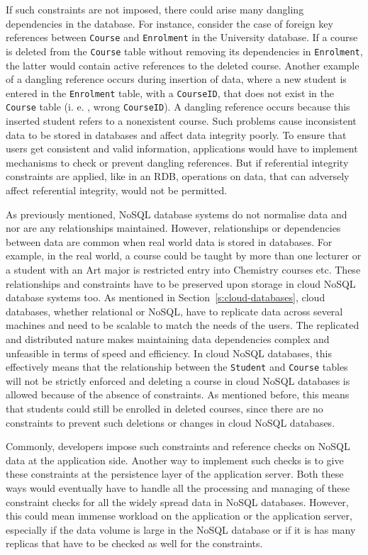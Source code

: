 If such constraints are not imposed,   there could arise many dangling
dependencies in the database.  For instance,   consider the case of foreign key
references between \texttt{Course} and \texttt{Enrolment} in the  University
database.  If a course is deleted from the \texttt{Course} table without removing
its dependencies in \texttt{Enrolment},   the latter would contain active references
to the deleted course.  Another example of a dangling reference occurs during
insertion of data,   where a new student is entered in the
\texttt{Enrolment} table,   with a \texttt{CourseID},   that does not
exist in the \texttt{Course} table (i. e. ,   wrong \texttt{CourseID}).  A dangling
reference occurs because this inserted student refers to a nonexistent course. 
Such problems cause inconsistent data to be stored in databases and affect data
integrity poorly.  To ensure that users get consistent and valid information,  
applications would have to implement mechanisms to check or prevent dangling references.  But if
referential integrity constraints are applied,   like in an \ac{RDB},   operations
on data,   that can adversely affect referential integrity,   would not be permitted. 

As previously mentioned,   \ac{NoSQL} database systems do not normalise data and
nor are any relationships maintained.  However,   relationships or dependencies
between data are common when real world data is stored in databases.  For example,   in the
real world,   a course could be taught by more than one lecturer or a student with
an Art major is restricted entry into Chemistry courses etc.  These relationships
and constraints have to be preserved upon storage in
cloud \ac{NoSQL} database systems too.  As mentioned in
Section~\ref{s:cloud-databases},   cloud databases,   whether relational or
\ac{NoSQL},   have to replicate data across several machines and need to be
scalable to match the needs of the users.  The replicated and distributed nature
makes maintaining data dependencies complex and unfeasible in terms of speed and
efficiency.  In cloud \ac{NoSQL} databases,   this effectively means that the
relationship between the \texttt{Student} and \texttt{Course} tables will not be strictly
enforced and deleting a course in cloud \ac{NoSQL} databases is allowed because
of the absence of constraints.  As mentioned before,   this means that students
could still be enrolled in deleted courses,   since there are no constraints to
prevent such deletions or changes in cloud \ac{NoSQL} databases. 

Commonly,   developers impose such constraints and reference checks on \ac{NoSQL}
data at the application side.  Another way to implement such checks is to give
these constraints at the persistence layer of the application server.  Both these
ways would eventually have to handle all the processing and managing of these
constraint checks for all the widely spread data in \ac{NoSQL} databases. 
However,   this could mean immense workload on the application or the application
server,   especially if the data volume is large in the \ac{NoSQL} database or if it is
has many replicas that have to be checked as well for the constraints. 



